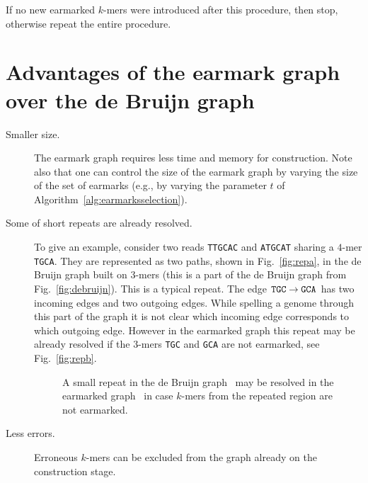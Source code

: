 \documentclass[12pt]{article}
\begin{document}
If no new earmarked $k$-mers were introduced after this procedure, then stop, otherwise repeat the entire procedure.

\section{Advantages of the earmark graph over the de Bruijn 
graph}\label{sec:advantages}

\begin{description}
\item[Smaller size.]
The earmark graph requires less time and memory for construction.
Note also that one can control the size of the earmark graph 
by varying the size of the set of earmarks (e.g., by varying the parameter $t$
of Algorithm~\ref{alg:earmarksselection}).
\item[Some of short repeats are already resolved.]
To give an example, consider two reads {\tt TTGCAC} and {\tt ATGCAT} 
sharing a $4$-mer {\tt TGCA}. They are represented as two paths, shown 
in Fig.~\ref{fig:repa}, in the de Bruijn graph built on $3$-mers
(this is a part of the de Bruijn graph from Fig.~\ref{fig:debruijn}).
This is a typical repeat. The edge ${\tt TGC}\rightarrow{\tt GCA}$ has two
incoming edges and two outgoing edges. While spelling a genome
through this part of the graph it is not clear which incoming edge 
corresponds to which outgoing edge. However in the earmarked graph
this repeat may be already resolved if the $3$-mers {\tt TGC} and {\tt GCA}
are not earmarked, see Fig.~\ref{fig:repb}.


\begin{figure}
\begin{center}
\end{center}
\caption{A small repeat in the de Bruijn graph~ may be resolved
in the earmarked graph~ in case $k$-mers from the repeated region are
not earmarked.}\label{fig:repeatexample}
\end{figure}

\item[Less errors.] Erroneous $k$-mers can be excluded from the graph already on
the construction stage.{}
\end{description}
\end{document}
